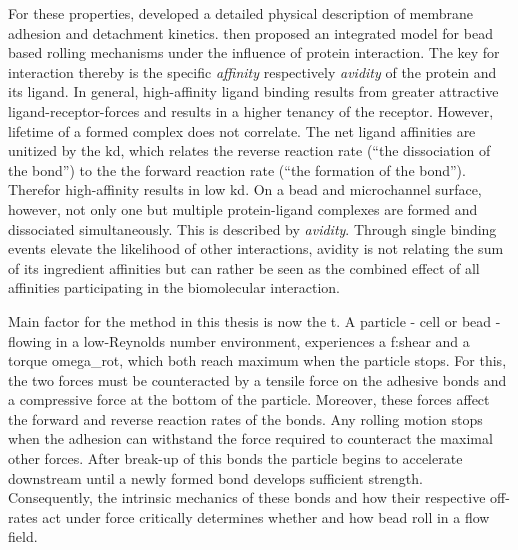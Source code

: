 \begin{figure}[!h]
\hfill
\label{fig:fluidic:model}
\end{figure}

For these properties, \citet{lit:fluidic:BindingPhysics} developed a detailed physical description of membrane adhesion and detachment kinetics. \citet{lit:fluidic:ModelMIT} then proposed an integrated model for bead based rolling mechanisms under the influence of protein interaction. The key for interaction thereby is the specific \textit{affinity} respectively \textit{avidity} of the protein and its ligand. In general, high-affinity ligand binding results from greater attractive ligand-receptor-forces and results in a higher tenancy of the receptor. However, lifetime of a formed complex does not correlate. The net ligand affinities are unitized by the \gls{kd}, which relates the reverse reaction rate (``the dissociation of the bond'') to the the forward reaction rate (``the formation of the bond''). Therefor high-affinity results in low \gls{kd}.\newline
On a bead and microchannel surface, however, not only one but multiple protein-ligand complexes are formed and dissociated simultaneously. This is described by \textit{avidity}. Through single binding events elevate the likelihood of other interactions, avidity is not relating the sum of its ingredient affinities but can rather be seen as the combined effect of all affinities participating in the biomolecular interaction.\cite{lit:bio:aviditiy}

Main factor for the method in this thesis is now the \gls{t}. A particle - cell or bead - flowing in a low-Reynolds number environment, experiences a \gls{f:shear} and a torque \gls{omega_rot}, which both reach maximum when the particle stops. For this, the two forces must be counteracted by a tensile force on the adhesive bonds and a compressive force at the bottom of the particle. Moreover, these forces affect the forward and reverse reaction rates of the bonds. Any rolling motion stops when the adhesion can withstand the force required to counteract the maximal other forces. After break-up of this bonds the particle begins to accelerate downstream until a newly formed bond develops sufficient strength. Consequently, the intrinsic mechanics of these bonds and how their respective off-rates act under force critically determines whether and how bead roll in a flow field.\cite{lit:bio:CellAdhesion}

